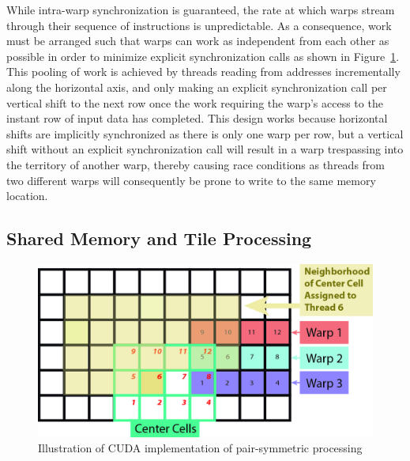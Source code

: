 \documentclass{IEEEtran}
\begin{document}
While intra-warp synchronization is guaranteed, the rate at which warps stream through their sequence of instructions is unpredictable. As a consequence, work must be arranged such that warps can work as independent from each other as possible in order to minimize explicit synchronization calls as shown in Figure~\ref{fig:pspro}. This pooling of work is achieved by threads reading from addresses incrementally along the horizontal axis, and only making an explicit synchronization call per vertical shift to the next row once the work requiring the warp's access to the instant row of input data has completed. This design works because horizontal shifts are implicitly synchronized as there is only one warp per row, but a vertical shift without an explicit synchronization call will result in a warp trespassing into the territory of another warp, thereby causing race conditions as threads from two different warps will consequently be prone to write to the same memory location. 

\subsection{Shared Memory and Tile Processing}

\begin{figure}
\includegraphics[width = 1 \columnwidth]{images/project22}
\caption{Illustration of CUDA implementation of pair-symmetric processing}
\label{fig:pspro}
\end{figure}
\end{document}
